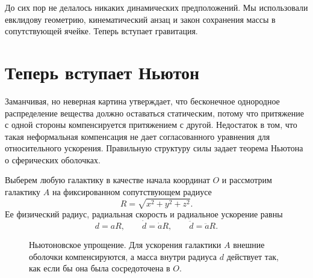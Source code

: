 До сих пор не делалось никаких динамических предположений. Мы использовали евклидову геометрию, кинематический анзац и закон сохранения массы в сопутствующей ячейке. Теперь вступает гравитация.

\section{Теперь вступает Ньютон}

Заманчивая, но неверная картина утверждает, что бесконечное однородное распределение вещества должно оставаться статическим, потому что притяжение с одной стороны компенсируется притяжением с другой. Недостаток в том, что такая неформальная компенсация не дает согласованного уравнения для относительного ускорения. Правильную структуру силы задает теорема Ньютона о сферических оболочках.

Выберем любую галактику в качестве начала координат \(O\) и рассмотрим галактику \(A\) на фиксированном сопутствующем радиусе
\begin{equation}
R=\sqrt{x^2+y^2+z^2}.
\end{equation}
Ее физический радиус, радиальная скорость и радиальное ускорение равны
\begin{equation}
d=aR,
\qquad
\dot d=\dot a R,
\qquad
\ddot d=\ddot a R.
\label{eq:c01-radial-kinematics}
\end{equation}

\begin{figure}[ht]
\centering
{}
\caption{Ньютоновское упрощение. Для ускорения галактики \(A\) внешние оболочки компенсируются, а масса внутри радиуса \(d\) действует так, как если бы она была сосредоточена в \(O\).}
\label{fig:c01-newton-sphere}
\end{figure}

